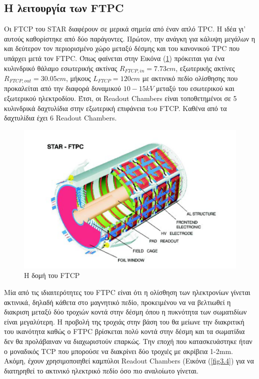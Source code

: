 	 	\subsection{Η λειτουργία των FTPC}

	Οι FTCP του STAR διαφέρουν σε μερικά σημεία από έναν απλό TPC. Η ιδέα γι' αυτούς καθορίστηκε από δύο παράγοντες. Πρώτον, την ανάγκη για κάλυψη μεγάλων η και δεύτερον τον περιορισμένο χώρο μεταξύ δέσμης και του κανονικού TPC που υπάρχει μετά τον FTPC. 
	Όπως φαίνεται στην Εικόνα (\ref{fig3.2}) πρόκειται για ένα κυλινδρικό θάλαμο εσωτερικής ακτίνας $R_{FTCP,in}=7.73cm$, εξωτερικής ακτίνες $R_{FTCP,out}=30.05cm$, μήκους $L_{FTCP}=120cm$ με ακτινικό πεδίο ολίσθησης που προκαλείται από την διαφορά δυναμικού $10-15kV$ μεταξύ του εσωτερικού και εξωτερικού ηλεκτροδίου. Έτσι, οι  Readout Chambers είναι τοποθετημένοι σε 5 κυλινδρικά δαχτυλίδια στην εξωτερική επιφάνεια τoυ FTCP. Καθένα από τα δαχτυλίδια έχει 6 Readout Chambers.
	
	\begin{figure}[h!]
		\centering
		\includegraphics[scale=0.5]{STAR_Detectors/STAR_FTCP.png}
		\caption{Η δομή του FTCP}
		\label{fig3.2}
	\end{figure}		 	
	 	
	 	
	 Μία από τις ιδιαιτερότητες του FTPC είναι ότι η ολίσθηση των ηλεκτρονίων γίνεται ακτινικά, δηλαδή κάθετα στο μαγνητικό πεδίο, προκειμένου να να βελτιωθεί η διακριση μεταξύ δύο τροχιών κοντά στην δέσμη όπου η πυκνότητα των σωματιδίων είναι μεγαλύτερη. Η προβολή της τροχιάς στην βάση του θα μείωνε την διακριτική του ικανότητα καθώς ο FTPC βρίσκεται πολύ κοντά στην δέσμη και τα σωματίδια δεν θα προλάβαιναν να διαχωριστούν επαρκώς. Την εποχή που κατασκευάστηκε ήταν ο μοναδικός TCP που μπορούσε να διακρίνει δύο τροχιές με ακρίβεια 1-2mm. Ακόμη, έχουν χρησιμοποιηθεί καμπύλοι Readout Chambers (Εικόνα (\ref{fig3.4}) για να διατηρηθεί το ακτινικό ηλεκτρικό πεδίο όσο πιο αναλοίωτο γίνεται. 
	 
